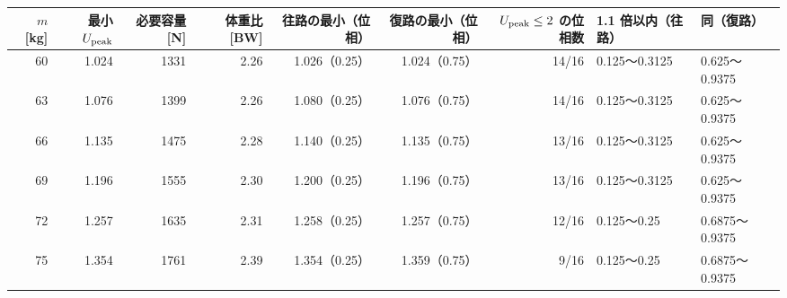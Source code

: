 \begin{tabular}{rrrrrrrll}
\toprule
$m$ [kg] & 最小 $U_{\mathrm{peak}}$ & 必要容量 [N] & 体重比 [BW] & 往路の最小（位相） & 復路の最小（位相） & $U_{\mathrm{peak}}\le2$ の位相数 & 1.1 倍以内（往路） & 同（復路） \\
\midrule
60 & 1.024 & 1331 & 2.26 & 1.026（0.25） & 1.024（0.75） & 14/16 & 0.125〜0.3125 & 0.625〜0.9375 \\
63 & 1.076 & 1399 & 2.26 & 1.080（0.25） & 1.076（0.75） & 14/16 & 0.125〜0.3125 & 0.625〜0.9375 \\
66 & 1.135 & 1475 & 2.28 & 1.140（0.25） & 1.135（0.75） & 13/16 & 0.125〜0.3125 & 0.625〜0.9375 \\
69 & 1.196 & 1555 & 2.30 & 1.200（0.25） & 1.196（0.75） & 13/16 & 0.125〜0.3125 & 0.625〜0.9375 \\
72 & 1.257 & 1635 & 2.31 & 1.258（0.25） & 1.257（0.75） & 12/16 & 0.125〜0.25 & 0.6875〜0.9375 \\
75 & 1.354 & 1761 & 2.39 & 1.354（0.25） & 1.359（0.75） & 9/16 & 0.125〜0.25 & 0.6875〜0.9375 \\
\bottomrule
\end{tabular}
